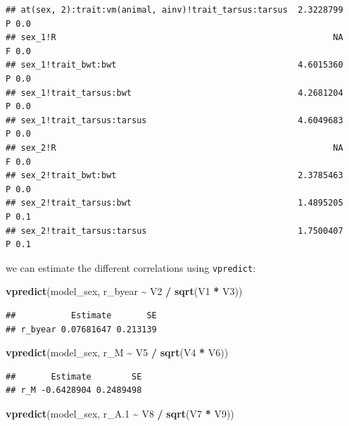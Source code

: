 \documentclass[
  12pt,
]{book}
\newenvironment{Shaded}{\begin{snugshade}}{\end{snugshade}}
\newcommand{\FloatTok}[1]{\textcolor[rgb]{0.00,0.00,0.81}{#1}}
\newcommand{\KeywordTok}[1]{\textcolor[rgb]{0.13,0.29,0.53}{\textbf{#1}}}
\newcommand{\NormalTok}[1]{#1}
\newcommand{\OperatorTok}[1]{\textcolor[rgb]{0.81,0.36,0.00}{\textbf{#1}}}
\newcommand{\StringTok}[1]{\textcolor[rgb]{0.31,0.60,0.02}{#1}}
\begin{document}
\begin{verbatim}
## at(sex, 2):trait:vm(animal, ainv)!trait_tarsus:tarsus  2.3228799     P 0.0
## sex_1!R                                                       NA     F 0.0
## sex_1!trait_bwt:bwt                                    4.6015360     P 0.0
## sex_1!trait_tarsus:bwt                                 4.2681204     P 0.0
## sex_1!trait_tarsus:tarsus                              4.6049683     P 0.0
## sex_2!R                                                       NA     F 0.0
## sex_2!trait_bwt:bwt                                    2.3785463     P 0.0
## sex_2!trait_tarsus:bwt                                 1.4895205     P 0.1
## sex_2!trait_tarsus:tarsus                              1.7500407     P 0.1
\end{verbatim}

we can estimate the different correlations using \texttt{vpredict}:

\begin{Shaded}
\begin{Highlighting}[]
\KeywordTok{vpredict}\NormalTok{(model\_sex, r\_byear }\OperatorTok{\textasciitilde{}}\StringTok{ }\NormalTok{V2 }\OperatorTok{/}\StringTok{ }\KeywordTok{sqrt}\NormalTok{(V1 }\OperatorTok{*}\StringTok{ }\NormalTok{V3))}
\end{Highlighting}
\end{Shaded}

\begin{verbatim}
##           Estimate       SE
## r_byear 0.07681647 0.213139
\end{verbatim}

\begin{Shaded}
\begin{Highlighting}[]
\KeywordTok{vpredict}\NormalTok{(model\_sex, r\_M }\OperatorTok{\textasciitilde{}}\StringTok{ }\NormalTok{V5 }\OperatorTok{/}\StringTok{ }\KeywordTok{sqrt}\NormalTok{(V4 }\OperatorTok{*}\StringTok{ }\NormalTok{V6))}
\end{Highlighting}
\end{Shaded}

\begin{verbatim}
##       Estimate        SE
## r_M -0.6428904 0.2489498
\end{verbatim}

\begin{Shaded}
\begin{Highlighting}[]
\KeywordTok{vpredict}\NormalTok{(model\_sex, r\_A}\FloatTok{.1} \OperatorTok{\textasciitilde{}}\StringTok{ }\NormalTok{V8 }\OperatorTok{/}\StringTok{ }\KeywordTok{sqrt}\NormalTok{(V7 }\OperatorTok{*}\StringTok{ }\NormalTok{V9))}
\end{Highlighting}
\end{Shaded}
\end{document}
